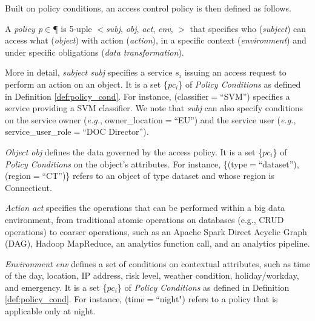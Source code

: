       \vspace{0.5em}

      Built on policy conditions, an access control policy is then defined as follows.
      \vspace{0.5em}
      \begin{definition}[Policy]\label{def:policy_rule}
        A {\it policy p}$\in$\P{} is 5-uple $<$\textit{subj}, \textit{obj}, \textit{act}, \textit{env}, \textit{\TP}$>$ that specifies who (\emph{subject}) can access what (\emph{object}) with action (\emph{action}), in a specific context (\emph{environment}) and under specific obligations (\emph{data transformation}).
      \end{definition}

      \vspace{0.5em}

      More in detail, \textit{subject subj} specifies a service $s_i$ issuing an access request to perform an action on an object. It is a set \{$pc_i$\} of \emph{Policy Conditions} as defined in Definition \ref{def:policy_cond}. For instance, (classifier$=$``SVM'') specifies a service providing a SVM classifier. We note that \textit{subj} can also specify conditions on the service owner (\textit{e.g.}, owner\_location$=$``EU'') and the service user (\textit{e.g.}, service\_user\_role$=$``DOC Director'').

      \textit{Object obj} defines the data governed by the access policy. It is a set \{$pc_i$\} of \emph{Policy Conditions} on the object's attributes.
      For instance, \{(type$=$``dataset''), (region$=$``CT'')\} refers to an object of type dataset and whose region is Connecticut.

      \textit{Action act} specifies the operations that can be performed within a big data environment, from traditional atomic operations on databases (e.g., CRUD operations) to coarser operations, such as an Apache Spark Direct Acyclic Graph (DAG), Hadoop MapReduce, an analytics function call, and an analytics pipeline.

      \textit{Environment env} defines a set of conditions on contextual attributes, such as time of the day, location, IP address, risk level, weather condition, holiday/workday, and emergency. It is a set \{$pc_i$\} of \emph{Policy Conditions} as defined in Definition \ref{def:policy_cond}. For instance, (time$=$``night") refers to a policy that is applicable only at night.

